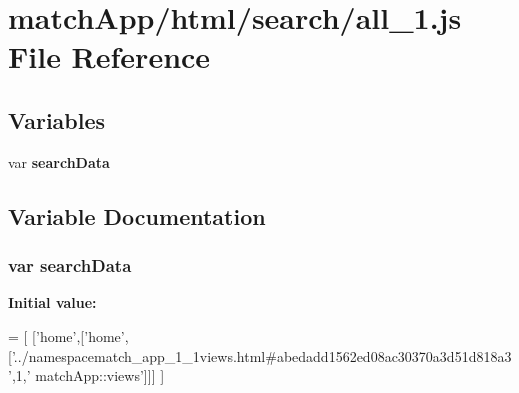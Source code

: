 \section{match\+App/html/search/all\+\_\+1.js File Reference}
\label{all__1_8js}
\subsection*{Variables}
\begin{DoxyCompactItemize}
\item 
var {\bf search\+Data}
\end{DoxyCompactItemize}


\subsection{Variable Documentation}
\subsubsection[{search\+Data}]{\setlength{\rightskip}{0pt plus 5cm}var search\+Data}\label{all__1_8js_ad01a7523f103d6242ef9b0451861231e}
{\bfseries Initial value\+:}
\begin{DoxyCode}
=
[
  [\textcolor{stringliteral}{'home'},[\textcolor{stringliteral}{'home'},[\textcolor{stringliteral}{'../namespacematch\_app\_1\_1views.html#abedadd1562ed08ac30370a3d51d818a3'},1,\textcolor{stringliteral}{'
      matchApp::views'}]]]
]
\end{DoxyCode}
